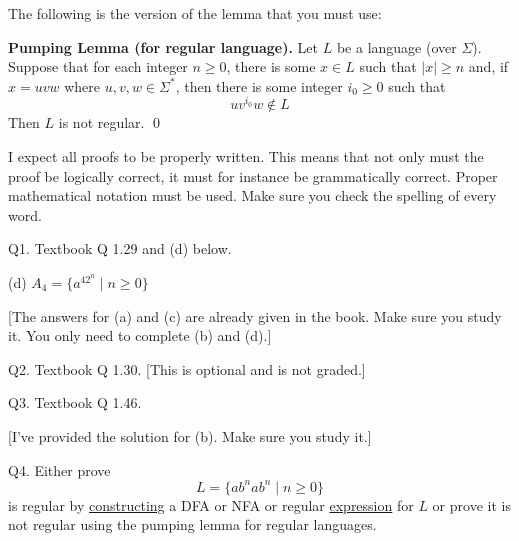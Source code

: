 



\renewcommand\TITLE{Assignment 20}
\renewcommand\AUTHOR{David Campbell}
\renewcommand\EMAIL{djcampbell2@cougars.ccis.edu}


\topmatter


The following is the version of the lemma that you must use:


{\bf Pumping Lemma (for regular language).}
Let $L$ be a language (over $\Sigma$).
Suppose that for each integer $n \geq 0$, there is some 
$x \in L$ such that $|x| \geq n$ and, 
if $x = uvw$ where $u,v,w \in \Sigma^*$, then
there is some integer $i_0 \geq 0$ such that
\[
uv^{i_0}w \not\in L
\]
Then $L$ is not regular. \qed

I expect all proofs to be properly written.
This means that not only must the proof be logically correct,
it must for instance be grammatically correct.
Proper mathematical notation must be used.
Make sure you check the spelling of every word.

\newpage


Q1. Textbook Q 1.29 and (d) below.

(d) $A_4 = \{ a^{42^n} \mid n \geq 0 \}$

[The answers for (a) and (c) are already given in the book.
Make sure you study it.
You only need to complete (b) and (d).]

\SOLUTION

 \newpage

 \newpage

 \newpage

 \newpage

\newpage




Q2. Textbook Q 1.30.
[This is optional and is not graded.]


\newpage




Q3. Textbook Q 1.46.

[I've provided the solution for (b). Make sure you study it.]

 \newpage
 \newpage
 \newpage
 \newpage


Q4. Either prove 
\[
L = \{ab^nab^n \mid n \geq 0 \}
\]
is regular by 
\underline{constructing}
a DFA or NFA or regular \underline{expression}
 for $L$
or prove it is not regular using the pumping lemma for regular languages.

